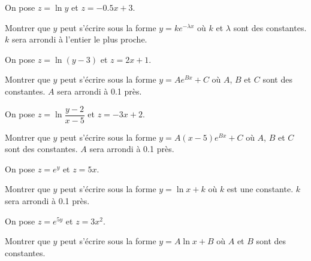 \documentclass[a4paper,12pt]{scrartcl}
\begin{document}

\begin{multicols}{3}








\end{multicols}


\begin{multicols}{2}




\end{multicols}

\exo[3]{}
On pose $z = \ln y$ et $z = -0.5x +3$.

Montrer que $y$ peut s'écrire sous la forme $y = k e^{- \lambda x}$ où $k$ et $\lambda$ sont des constantes. $k$ sera arrondi à l'entier le plus proche.

\exo[3]{}
On pose $z = \ln (y-3)$ et $z = 2x +1$.

Montrer que $y$ peut s'écrire sous la forme $y = A e^{B x} + C$ où $A$, $B$ et $C$ sont des constantes. $A$ sera arrondi à 0.1 près.

\exo[3]{}
On pose $z = \ln \dfrac{y-2}{x-5}$ et $z = -3x +2$.

Montrer que $y$ peut s'écrire sous la forme $y = A(x-5) e^{B x} + C$ où $A$, $B$ et $C$ sont des constantes. $A$ sera arrondi à 0.1 près.

\exo[3]{}
On pose $z = e^y$ et $z = 5x$.

Montrer que $y$ peut s'écrire sous la forme $y = \ln x + k$ où $k$ est une constante. $k$ sera arrondi à 0.1 près.

\exo[3]{}
On pose $z = e^{5y}$ et $z = 3x^2$.

Montrer que $y$ peut s'écrire sous la forme $y = A \ln x + B$ où $A$ et $B$ sont des constantes. 
\end{document}
